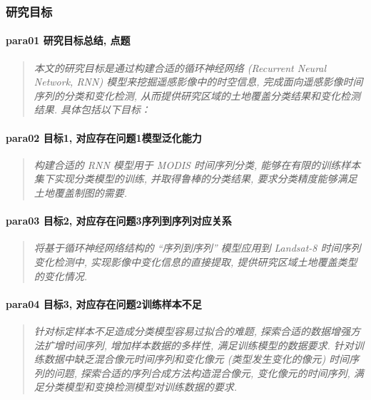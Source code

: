 \subsubsection{研究目标}
\paragraph*{para01
    \textcolor[RGB]{17, 205, 29}{研究目标总结, 点题}}
\begin{quotation}
    \itshape
    本文的研究目标是通过构建合适的循环神经网络 (Recurrent Neural Network, RNN) 模型来挖掘遥感影像中的时空信息, 完成面向遥感影像时间序列的分类和变化检测, 从而提供研究区域的土地覆盖分类结果和变化检测结果. 具体包括以下目标： 
\end{quotation}

\paragraph*{para02
    \textcolor[RGB]{17, 205, 29}{目标1, 对应存在问题1模型泛化能力}}
\begin{quotation}
    \itshape
    构建合适的 RNN 模型用于 MODIS 时间序列分类, 能够在有限的训练样本集下实现分类模型的训练, 并取得鲁棒的分类结果, 要求分类精度能够满足土地覆盖制图的需要.
\end{quotation}

\paragraph*{para03
    \textcolor[RGB]{17, 205, 29}{目标2, 对应存在问题3序列到序列对应关系}}
\begin{quotation}
    \itshape
    将基于循环神经网络结构的 ``序列到序列'' 模型应用到 Landsat-8 时间序列变化检测中, 实现影像中变化信息的直接提取, 提供研究区域土地覆盖类型的变化情况. 
\end{quotation}

\paragraph*{para04
    \textcolor[RGB]{17, 205, 29}{目标3, 对应存在问题2训练样本不足}}
\begin{quotation}
    \itshape
    针对标定样本不足造成分类模型容易过拟合的难题, 探索合适的数据增强方法扩增时间序列, 增加样本数据的多样性, 满足训练模型的数据要求. 针对训练数据中缺乏混合像元时间序列和变化像元 (类型发生变化的像元) 时间序列的问题, 探索合适的序列合成方法构造混合像元, 变化像元的时间序列, 满足分类模型和变换检测模型对训练数据的要求.
\end{quotation}

